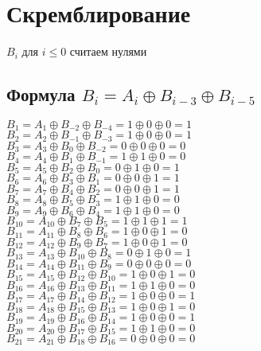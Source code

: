 \section{Скремблирование}
$B_i$ для $i\leq 0$ считаем нулями
\subsection{Формула $B_i=A_i\oplus B_{i-3}\oplus B_{i-5}$}

$B_{1}=A_{1}\oplus B_{-2}\oplus B_{-4}=1\oplus 0\oplus 0=1$\\
$B_{2}=A_{2}\oplus B_{-1}\oplus B_{-3}=1\oplus 0\oplus 0=1$\\
$B_{3}=A_{3}\oplus B_{0}\oplus B_{-2}=0\oplus 0\oplus 0=0$\\
$B_{4}=A_{4}\oplus B_{1}\oplus B_{-1}=1\oplus 1\oplus 0=0$\\
$B_{5}=A_{5}\oplus B_{2}\oplus B_{0}=0\oplus 1\oplus 0=1$\\
$B_{6}=A_{6}\oplus B_{3}\oplus B_{1}=0\oplus 0\oplus 1=1$\\
$B_{7}=A_{7}\oplus B_{4}\oplus B_{2}=0\oplus 0\oplus 1=1$\\
$B_{8}=A_{8}\oplus B_{5}\oplus B_{3}=1\oplus 1\oplus 0=0$\\
$B_{9}=A_{9}\oplus B_{6}\oplus B_{4}=1\oplus 1\oplus 0=0$\\
$B_{10}=A_{10}\oplus B_{7}\oplus B_{5}=1\oplus 1\oplus 1=1$\\
$B_{11}=A_{11}\oplus B_{8}\oplus B_{6}=1\oplus 0\oplus 1=0$\\
$B_{12}=A_{12}\oplus B_{9}\oplus B_{7}=1\oplus 0\oplus 1=0$\\
$B_{13}=A_{13}\oplus B_{10}\oplus B_{8}=0\oplus 1\oplus 0=1$\\
$B_{14}=A_{14}\oplus B_{11}\oplus B_{9}=0\oplus 0\oplus 0=0$\\
$B_{15}=A_{15}\oplus B_{12}\oplus B_{10}=1\oplus 0\oplus 1=0$\\
$B_{16}=A_{16}\oplus B_{13}\oplus B_{11}=1\oplus 1\oplus 0=0$\\
$B_{17}=A_{17}\oplus B_{14}\oplus B_{12}=1\oplus 0\oplus 0=1$\\
$B_{18}=A_{18}\oplus B_{15}\oplus B_{13}=1\oplus 0\oplus 1=0$\\
$B_{19}=A_{19}\oplus B_{16}\oplus B_{14}=1\oplus 0\oplus 0=1$\\
$B_{20}=A_{20}\oplus B_{17}\oplus B_{15}=1\oplus 1\oplus 0=0$\\
$B_{21}=A_{21}\oplus B_{18}\oplus B_{16}=0\oplus 0\oplus 0=0$\\
